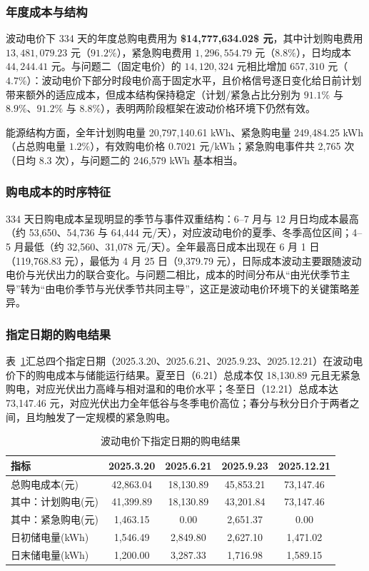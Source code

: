 \documentclass[zihao=-4,a4paper,UTF8,fontset=none]{ctexart}
\begin{document}
\subsubsection{年度成本与结构}

波动电价下 334 天的年度总购电费用为 \textbf{\$14{,}777{,}634.02\$ 元}，其中计划购电费用 $13{,}481{,}079.23$ 元（$91.2\%$），紧急购电费用 $1{,}296{,}554.79$ 元（$8.8\%$），日均成本 $44{,}244.41$ 元。与问题二（固定电价）的 $14{,}120{,}324$ 元相比增加 $657{,}310$ 元（$4.7\%$）：波动电价下部分时段电价高于固定水平，且价格信号逐日变化给日前计划带来额外的适应成本，但成本结构保持稳定（计划/紧急占比分别为 $91.1\%$ 与 $8.9\%$、$91.2\%$ 与 $8.8\%$），表明两阶段框架在波动价格环境下仍然有效。

能源结构方面，全年计划购电量 20{,}797{,}140.61 kWh、紧急购电量 249{,}484.25 kWh（占总购电量 $1.2\%$），有效购电价格 $0.7021$ 元/kWh；紧急购电事件共 2{,}765 次（日均 8.3 次），与问题二的 246{,}579 kWh 基本相当。

\subsubsection{购电成本的时序特征}

334 天日购电成本呈现明显的季节与事件双重结构：6--7 月与 12 月日均成本最高（约 53,650、54,736 与 64,444 元/天），对应波动电价的夏季、冬季高位区间；4--5 月最低（约 32,560、31,078 元/天）。全年最高日成本出现在 6 月 1 日（119,768.83 元），最低为 4 月 25 日（9,379.79 元），日际成本波动主要跟随波动电价与光伏出力的联合变化。与问题二相比，成本的时间分布从“由光伏季节主导”转为“由电价季节与光伏季节共同主导”，这正是波动电价环境下的关键策略差异。

\subsubsection{指定日期的购电结果}

表~\ref{tab:q4_days}汇总四个指定日期（2025.3.20、2025.6.21、2025.9.23、2025.12.21）在波动电价下的购电成本与储能运行结果。夏至日（6.21）总成本仅 18,130.89 元且无紧急购电，对应光伏出力高峰与相对温和的电价水平；冬至日（12.21）总成本达 73,147.46 元，对应光伏出力全年低谷与冬季电价高位；春分与秋分日介于两者之间，且均触发了一定规模的紧急购电。

\begin{table}[H]
  \centering
  \caption{波动电价下指定日期的购电结果}
  \label{tab:q4_days}
  \small
  \begin{tabular}{lcccc}
    \toprule
    指标 & 2025.3.20 & 2025.6.21 & 2025.9.23 & 2025.12.21 \\
    \midrule
    总购电成本(元) & 42,863.04 & 18,130.89 & 45,853.21 & 73,147.46 \\
    其中：计划购电(元) & 41,399.89 & 18,130.89 & 43,201.84 & 73,147.46 \\
    其中：紧急购电(元) & 1,463.15 & 0.00 & 2,651.37 & 0.00 \\
    日初储电量(kWh) & 1,546.49 & 2,849.80 & 2,627.10 & 1,471.02 \\
    日末储电量(kWh) & 1,200.00 & 3,287.33 & 1,716.98 & 1,589.15 \\
    \bottomrule
  \end{tabular}
\end{table}
\end{document}
